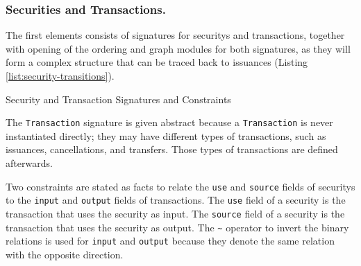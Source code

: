 \subsubsection{Securities and Transactions.}

The first elements consists of signatures for \glspl{security} and \glspl{transaction}, together with opening of the ordering and graph modules for both signatures, as they will form a complex structure that can be traced back to issuances (Listing \ref{list:security-transitions}).

\begin{listing}[!h]
	\caption{Security and Transaction Signatures and Constraints
    \label{list:security-transitions}
    }
\end{listing}

The \verb|Transaction| signature is given abstract because a \verb|Transaction| is never instantiated directly; they may have different types of \glspl{transaction}, such as issuances, cancellations, and transfers. Those types of \glspl{transaction} are defined afterwards.

Two constraints are stated as facts to relate the \verb|use| and \verb|source| fields of \glspl{security} to the \verb|input| and \verb|output| fields of \glspl{transaction}. The \verb|use| field of a \gls{security} is the transaction that uses the \gls{security} as input. The \verb|source| field of a \gls{security} is the transaction that uses the \gls{security} as output.
%
%
The \verb|~| operator to invert the binary relations is used for \verb|input| and \verb|output| because they denote the same relation with the opposite direction.

